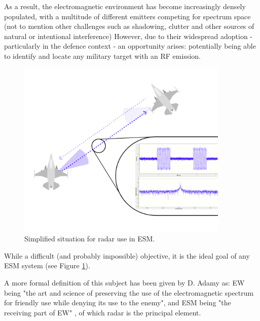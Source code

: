 As a result, the electromagnetic environment has become increasingly densely populated, with a multitude of different emitters competing for spectrum space (not to mention other challenges such as shadowing, clutter and other sources of natural or intentional interference)
However, due to their widespread adoption - particularly in the defence context - an opportunity arises: potentially being able to identify and locate any military target with an \ac{RF} emission.
\begin{figure}
    \centering
    \includegraphics[width=0.9\textwidth]{Figures/Senario_ Single Radar; single signal.png}
    \caption{Simplified situation for radar use in ESM.}
    \label{Fig:radar_signals_in_ew}
\end{figure}

While a difficult (and probably impossible) objective, it is the ideal goal of any \ac{ESM} system (see Figure \ref{Fig:radar_signals_in_ew}).

A more formal definition of this subject has been given by D. Adamy \cite{adamy_13_2001} as: \ac{EW} being "the art and science of preserving the use of the electromagnetic spectrum for friendly use while denying its use to the enemy", and \ac{ESM} being "the receiving part of EW" \cite{adamy_13_2001}, of which radar is the principal element.



